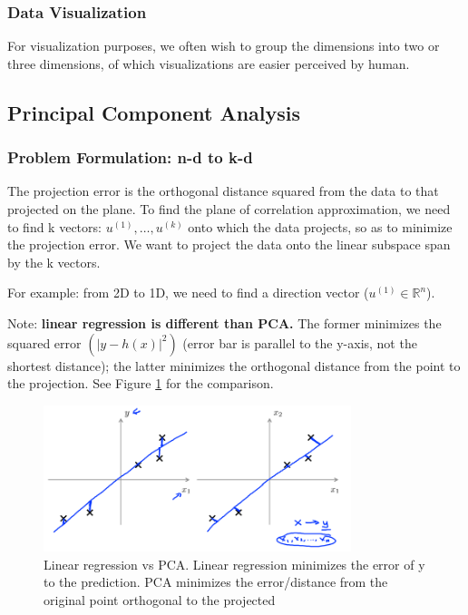     \subsubsection{Data Visualization}
    For visualization purposes, we often wish to group the dimensions into two or three dimensions, of which visualizations are easier perceived by human.

\subsection{Principal Component Analysis}
    \subsubsection{Problem Formulation: n-d to k-d}
    The projection error is the orthogonal distance squared from the data to that projected on the plane.
    To find the plane of correlation approximation, we need to find k vectors: $u^{(1)}, \dots,u^{(k)}$ onto which the data projects, so as to minimize the projection error. We want to project the data onto the linear subspace span by the k vectors. 

    \par For example: from 2D to 1D, we need to find a direction vector ($u^{(1)} \in \mathbb{R}^n$).

    \par Note: \textbf{linear regression is different than PCA.} The former minimizes the squared error $(|y - h(x)|^2)$ (error bar is parallel to the y-axis, not the shortest distance); the latter minimizes the orthogonal distance from the point to the projection. See Figure \ref{fig:linear-regression-PCA} for the comparison.

    \begin{figure}[htpb]
        \centering
        \includegraphics[width=0.8\textwidth]{image/linear-regression-PCA.png}
        \caption{Linear regression vs PCA. Linear regression minimizes the error of y to the prediction. PCA minimizes the error/distance from the original point orthogonal to the projected}
        \label{fig:linear-regression-PCA}
    \end{figure}
